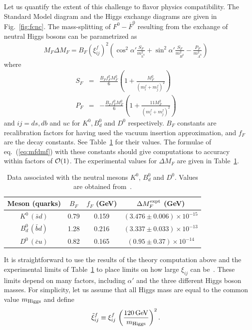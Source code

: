 \documentclass[12pt]{article}
\def\beq{\begin{eqnarray}}
\def\eeq{\end{eqnarray}}
\def\bea{\begin{eqnarray}}
\def\eea{\end{eqnarray}}
\def\gev{\, {\rm GeV}}
\begin{document}
Let us quantify the extent of this challenge to flavor physics compatibility. The Standard Model diagram and the Higgs exchange diagrams are given in Fig.~\ref{fig:fcnc}. The mass-splitting of  $F^0-\overline{F}^0$  resulting from the exchange of neutral Higgs bosons can be parametrized as
\beq
M_F\Delta M_F=B_F(\xi^f_{ij})^2\left( \cos^2\alpha'\frac{S_F}{m^2_{h^0}}
+\sin^2\alpha'\frac{S_F}{m^2_{H^0}}-\frac{P_F}{m^2_{A^0}}\right)
\label{eq:mfdmf}
\eeq
where
\bea
S_F &=& \frac{B_F f_F^2 M_F^2}{6}\left(1+\frac{ M_F^2}{(m^f_i +m^f_j)^2}\right)\\
P_F &=& -\frac{B_F f_F^2 M_F^2}{6}\left(1+\frac{11 M_F^2}{(m^f_i +m^f_j)^2}\right)
\eea
and $ij=ds, db$ and $uc$ for $K^0,B^0_d$ and $D^0$ respectively. $B_F$ constants are recalibration factors for having used the vacuum insertion approximation, and $f_F$ are the decay constants. See Table~\ref{table:mesons} for their values.  The formulae of eq.~(\ref{eq:mfdmf}) with these constants should give computations to accuracy within factors of ${\cal O}(1)$.
The  experimental values for $\Delta M_F$ are given in  Table~\ref{table:mesons}.
\begin{table}[t]
\centering
\begin{tabular}{cccc}
Meson (quarks) & $B_F$ & $f_F$ (GeV) & $\Delta M_F^{\rm expt}$ (GeV) \\
\hline
$K^0\,(\bar sd)$  & 0.79 & 0.159&  $(3.476\pm 0.006)\times 10^{-15} $ \\                                              
$B_d^0\, (\bar bd)$  & 1.28 & 0.216 &  $(3.337\pm0.033)\times 10^{-13} $  \\
$D^0\,(\bar cu)$  & 0.82 & 0.165 & $(0.95\pm0.37)\times 10^{-14} $  \\ 
\hline
\end{tabular}
\caption{Data associated with the neutral mesons $K^0$, $B^0_d$ and $D^0$. Values are obtained from~\cite{Lunghi:2007ak,Lubicz:2007yu}.}
\label{table:mesons}
\end{table}

It is straightforward to use the results of the theory computation above and the experimental limits of Table~\ref{table:mesons} to place limits on how large $\xi_{ij}$ can be~\cite{Atwood:1996vj,Gupta:soon}. These limits depend on many factors, including $\alpha'$ and the three different Higgs boson masses. For simplicity, let us assume that all Higgs mass are equal to the common value $m_{\rm Higgs}$ and define 
\beq
\tilde\xi^f_{ij}\equiv \xi^f_{ij}\,\left( \frac{120\gev}{m_{\rm Higgs}}\right)^2.
\eeq
\end{document}
